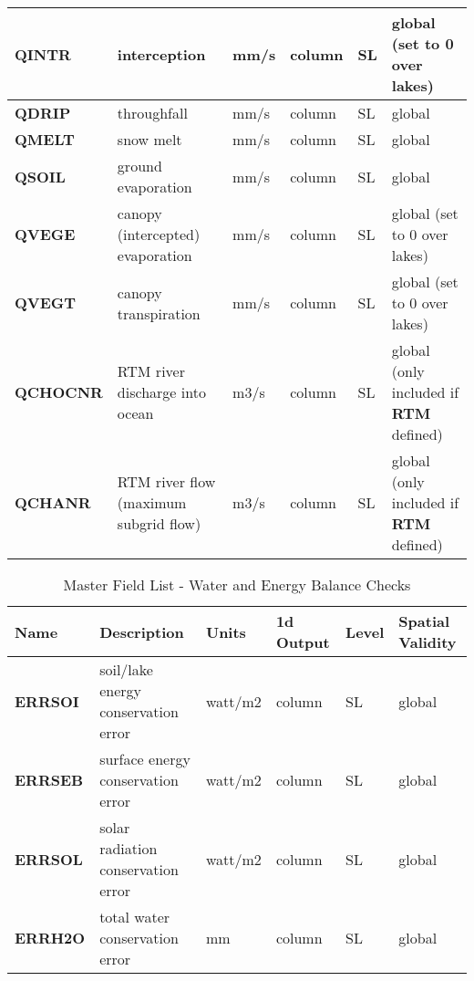 \begin{longtable}{|l|p{2.3in}|l|l|l|p{1.0in}|}
{\bf QINTR} 
& interception 
& mm/s         
& column
& SL
& global (set to 0 over lakes) \\
\hline

{\bf QDRIP} 
& throughfall 
& mm/s         
& column
& SL
& global \\
\hline

{\bf QMELT} 
& snow melt 
& mm/s         
& column
& SL
& global \\
\hline

{\bf QSOIL} 
& ground evaporation 
& mm/s         
& column
& SL
& global \\
\hline

{\bf QVEGE} 
& canopy (intercepted) evaporation 
& mm/s         
& column
& SL
& global (set to 0 over lakes) \\
\hline

{\bf QVEGT} 
& canopy transpiration 
& mm/s         
& column
& SL
& global (set to 0 over lakes) \\
\hline

{\bf QCHOCNR} 
& RTM river discharge into ocean 
& m3/s         
& column
& SL
& global (only included if {\bf RTM} defined) \\
\hline

{\bf QCHANR} 
& RTM river flow (maximum subgrid flow) 
& m3/s         
& column
& SL
& global (only included if {\bf RTM} defined) \\
\hline

\end{longtable}

\begin{longtable}{|l|p{2.3in}|l|l|l|p{1.0in}|} 
\caption{\label{master_field_list_check} Master Field List - Water and Energy Balance Checks} \\
\hline
\endhead
\hline
Name & Description & Units & 1d Output & Level & Spatial Validity  \\ 
\hline	\hline	

{\bf ERRSOI} 
& soil/lake energy conservation error 
& watt/m2         
& column
& SL
& global \\
\hline

{\bf ERRSEB} 
& surface energy conservation error 
& watt/m2         
& column
& SL
& global \\
\hline

{\bf ERRSOL} 
& solar radiation conservation error 
& watt/m2         
& column
& SL
& global \\
\hline

{\bf ERRH2O} 
& total water conservation error 
& mm         
& column
& SL
& global \\
\hline

\end{longtable}

